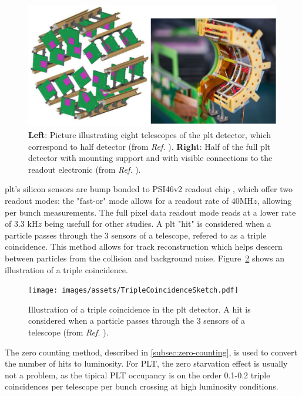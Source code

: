 \begin{figure}[H]
	\centering
	\includegraphics[width=\textwidth]{images/assets/cms_plt.png}
	\caption[PLT detector telescopes]{\textbf{Left}: Picture illustrating eight telescopes of the \acrshort{plt} detector, which correspond to half detector (from \textit{Ref.} \cite{Romeo:2797807}). \textbf{Right}: Half of the full \acrshort{plt} detector with mounting support and with visible connections to the readout electronic (from \textit{Ref.} \cite{DelannoySotomayor:2765247}).}
	\label{fig:cms_plt}
\end{figure}

\acrshort{plt}'s silicon sensors are bump bonded to PSI46v2 readout chip \cite{KASTLI2006188}, which offer two readout modes: the "fast-or" mode allows for a readout rate of 40MH$z$, allowing per bunch measurements. The full pixel data readout mode reads at a lower rate of 3.3 kH$z$ being usefull for other studies. A \acrshort{plt} "hit" is considered when a particle passes through the 3 sensors of a telescope, refered to as a triple coincidence. This method allows for track reconstruction which helps descern between particles from the collision and background noise. Figure~\ref{fig:plt_triple_coincidence} shows an illustration of a triple coincidence.

\begin{figure}[H]
	\centering
	\texttt{[image: images/assets/TripleCoincidenceSketch.pdf]}
	\caption[Triple coincidence in PLT]{Illustration of a triple coincidence in the \acrshort{plt} detector. A hit is considered when a particle passes through the 3 sensors of a telescope (from \textit{Ref.} \cite{Lujan:2797692}).}
	\label{fig:plt_triple_coincidence}
\end{figure}

The zero counting method, described in \autoref{subsec:zero-counting}, is used to convert the number of hits to luminosity. For PLT, the zero starvation effect is usually not a problem, as the tipical PLT occupancy is on the order 0.1-0.2 triple coincidences per telescope per bunch crossing at high luminosity conditions.

